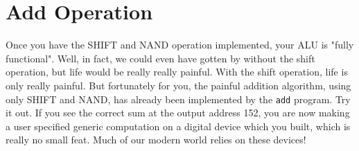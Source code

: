 \documentclass[12pt]{article}
\begin{document}
\section{Add Operation}

Once you have the SHIFT and NAND operation implemented, your ALU is "fully functional".  Well, in fact, we could even have gotten by without the shift operation, but life would be really really painful.  With the shift operation, life is only really painful.  But fortunately for you, the painful addition algorithm, using only SHIFT and NAND, has already been implemented by the {\tt add} program.  Try it out.  If you see the correct sum at the output address 152, you are now making a user specified generic computation on a digital device which you built, which is really no small feat.  Much of our modern world relies on these devices!
\end{document}
